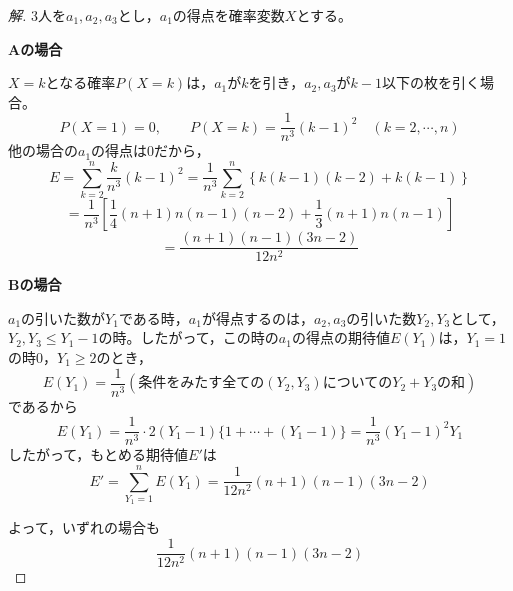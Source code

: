 \documentclass[../main.tex]{subfiles}
\begin{document}
\begin{proof}[解]
  3人を$a_1,a_2,a_3$とし，$a_1$の得点を確率変数$X$とする。

  \textbf{Aの場合}

  $X=k$となる確率$P(X=k)$は，$a_1$が$k$を引き，$a_2,a_3$が$k-1$以下の枚を引く場合。
  \[
    P(X=1)=0, \qquad P(X=k)=\frac{1}{n^3}(k-1)^2\quad(k=2,\cdots,n)
  \]
  他の場合の$a_1$の得点は0だから，
  \[
    E=\sum_{k=2}^n\frac{k}{n^3}(k-1)^2=\frac{1}{n^3}\sum_{k=2}^n\left\{k(k-1)(k-2)+k(k-1)\right\}
  \]
  \[
    =\frac{1}{n^3}\left[\frac14(n+1)n(n-1)(n-2)+\frac13(n+1)n(n-1)\right]
  \]
  \[
    =\frac{(n+1)(n-1)(3n-2)}{12n^2}
  \]

  \textbf{Bの場合}

  $a_1$の引いた数が$Y_1$である時，$a_1$が得点するのは，$a_2,a_3$の引いた数$Y_2,Y_3$として，$Y_2,Y_3\le Y_1-1$の時。したがって，この時の$a_1$の得点の期待値$E(Y_1)$は，$Y_1=1$の時0，$Y_1\ge2$のとき，
  \[
    E(Y_1)=\frac{1}{n^3}\left(\text{条件をみたす全ての}(Y_2,Y_3)\text{についての}Y_2+Y_3\text{の和}\right)
  \]
  であるから
  \[
    E(Y_1)=\frac{1}{n^3}\cdot2(Y_1-1)\{1+\cdots+(Y_1-1)\}=\frac{1}{n^3}(Y_1-1)^2Y_1
  \]
  したがって，もとめる期待値$E'$は
  \[
    E'=\sum_{Y_1=1}^nE(Y_1)=\frac{1}{12n^2}(n+1)(n-1)(3n-2)
  \]

  よって，いずれの場合も
  \[
    \frac{1}{12n^2}(n+1)(n-1)(3n-2)
  \]
\end{proof}
\end{document}
